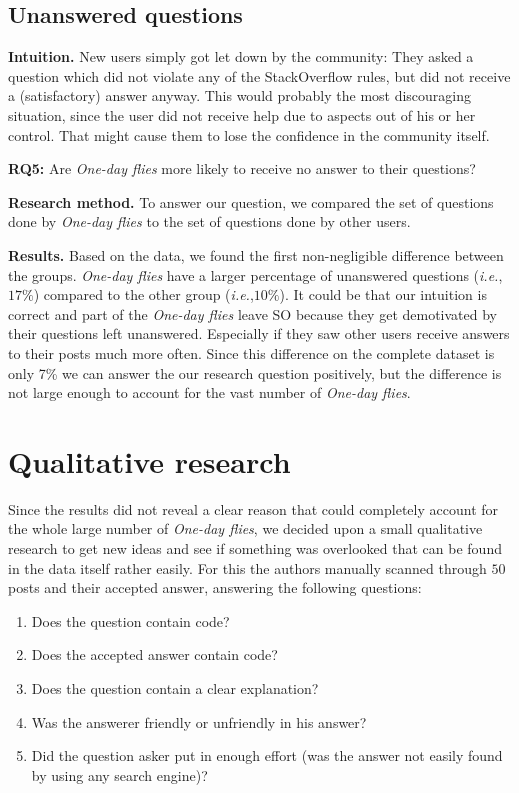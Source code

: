 \documentclass[conference]{IEEEtran}
\newcommand{\ie}{\emph{i.e.},\xspace}
\newcommand\odf{\emph{One-day flies}\xspace}
\begin{document}
\subsection{Unanswered questions}

\textbf{Intuition.} New users simply got let down by the community: They asked
a question which did not violate any of the StackOverflow rules, but did not
receive a (satisfactory) answer anyway. This would probably the most
discouraging situation, since the user did not receive help due to aspects out
of his or her control. That might cause them to lose the confidence in the
community itself. 
 
\textbf{RQ5:} Are \odf more likely to receive no answer to their questions?
 
\textbf{Research method.} To answer our question, we compared the set of
questions done by \odf to the set of questions done by other users.

\textbf{Results.} Based on the data, we found the first non-negligible
difference between the groups. \odf have a larger percentage of unanswered
questions (\ie $17\%$) compared to the other group (\ie $10\%$). It could be
that our intuition is correct and part of the \odf leave SO because they get
demotivated by their questions left unanswered. Especially if they saw other
users receive answers to their posts much more often. Since this difference on
the complete dataset is only 7\% we can answer the our research question
positively, but the difference is not large enough to account for the vast
number of \odf.



\section{Qualitative research}\label{QualitativeResearch}
Since the results did not reveal a clear reason that could completely account
for the whole large number of \odf, we decided upon a small qualitative research to get new ideas
and see if something was overlooked that can be found in the data itself rather
easily.  For this the authors manually scanned through $50$ posts and their
accepted answer, answering the following questions:

\begin{enumerate}
\item Does the question contain code?
\item Does the accepted answer contain code?
\item Does the question contain a clear explanation?
\item Was the answerer friendly or unfriendly in his answer?
\item Did the question asker put in enough effort (was the answer not easily
found by using any search engine)?  
\end{enumerate}
\end{document}
